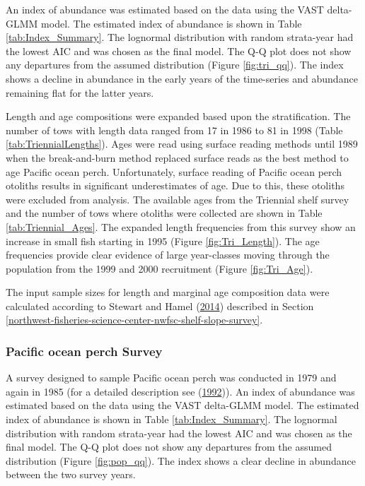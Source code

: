 \documentclass[12pt,]{article}
\begin{document}
An index of abundance was estimated based on the data using the VAST
delta-GLMM model. The estimated index of abundance is shown in Table
\ref{tab:Index_Summary}. The lognormal distribution with random
strata-year had the lowest AIC and was chosen as the final model. The
Q-Q plot does not show any departures from the assumed distribution
(Figure \ref{fig:tri_qq}). The index shows a decline in abundance in the
early years of the time-series and abundance remaining flat for the
latter years.

Length and age compositions were expanded based upon the stratification.
The number of tows with length data ranged from 17 in 1986 to 81 in 1998
(Table \ref{tab:TriennialLengths}). Ages were read using surface reading
methods until 1989 when the break-and-burn method replaced surface reads
as the best method to age Pacific ocean perch. Unfortunately, surface
reading of Pacific ocean perch otoliths results in significant
underestimates of age. Due to this, these otoliths were excluded from
analysis. The available ages from the Triennial shelf survey and the
number of tows where otoliths were collected are shown in Table
\ref{tab:Triennial_Ages}. The expanded length frequencies from this
survey show an increase in small fish starting in 1995 (Figure
\ref{fig:Tri_Length}). The age frequencies provide clear evidence of
large year-classes moving through the population from the 1999 and 2000
recruitment (Figure \ref{fig:Tri_Age}).

The input sample sizes for length and marginal age composition data were
calculated according to Stewart and Hamel
(\protect\hyperlink{ref-stewart_bootstrapping_2014}{2014}) described in
Section
\ref{northwest-fisheries-science-center-nwfsc-shelf-slope-survey}.

\subsubsection{Pacific ocean perch
Survey}\label{pacific-ocean-perch-survey}

A survey designed to sample Pacific ocean perch was conducted in 1979
and again in 1985 (for a detailed description see
(\protect\hyperlink{ref-ianelli_status_1992}{1992})). An index of
abundance was estimated based on the data using the VAST delta-GLMM
model. The estimated index of abundance is shown in Table
\ref{tab:Index_Summary}. The lognormal distribution with random
strata-year had the lowest AIC and was chosen as the final model. The
Q-Q plot does not show any departures from the assumed distribution
(Figure \ref{fig:pop_qq}). The index shows a clear decline in abundance
between the two survey years.
\end{document}
